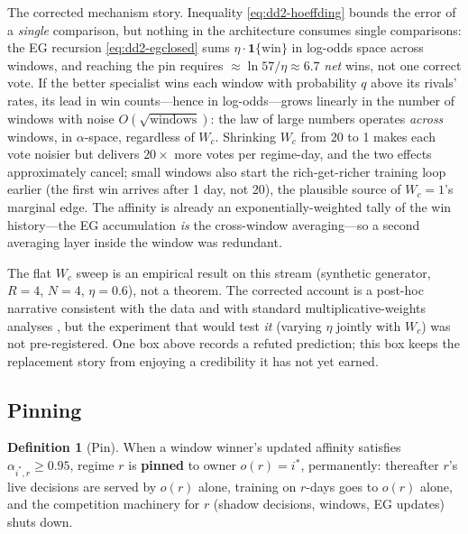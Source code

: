 \documentclass[11pt,a4paper]{article}
\theoremstyle{definition}
\newtheorem{definition}{Definition}[section]
\theoremstyle{plain}
\begin{document}
The corrected mechanism story. Inequality \eqref{eq:dd2-hoeffding} bounds the
error of a \emph{single} comparison, but nothing in the architecture consumes
single comparisons: the EG recursion \eqref{eq:dd2-egclosed} sums
$\eta \cdot \mathbf{1}\{\text{win}\}$ in log-odds space across windows, and
reaching the pin requires $\approx \ln 57 / \eta \approx 6.7$ \emph{net}
wins, not one correct vote. If the better specialist wins each window with
probability $q$ above its rivals' rates, its lead in win counts---hence in
log-odds---grows linearly in the number of windows with noise
$O(\sqrt{\text{windows}})$: the law of large numbers operates \emph{across}
windows, in $\alpha$-space, regardless of $W_c$. Shrinking $W_c$ from 20 to 1
makes each vote noisier but delivers $20\times$ more votes per regime-day,
and the two effects approximately cancel; small windows also start the
rich-get-richer training loop earlier (the first win arrives after 1 day, not
20), the plausible source of $W_c = 1$'s marginal edge. The affinity is
already an exponentially-weighted tally of the win history---the EG
accumulation \emph{is} the cross-window averaging---so a second averaging
layer inside the window was redundant.

\begin{warning}[title={Do not quietly upgrade the corrected story to a prediction}]
The flat $W_c$ sweep is an empirical result on this stream (synthetic
generator, $R = 4$, $N = 4$, $\eta = 0.6$), not a theorem. The corrected
account is a post-hoc narrative consistent with the data and with standard
multiplicative-weights analyses
\citep{freund1997decision, arora2012multiplicative}, but the experiment that
would test \emph{it} (varying $\eta$ jointly with $W_c$) was not
pre-registered. One box above records a refuted prediction; this box keeps
the replacement story from enjoying a credibility it has not yet earned.
\end{warning}

\subsection{Pinning}
\label{sec:dd2-pinning}

\begin{definition}[Pin]
\label{def:dd2-pin}
When a window winner's updated affinity satisfies
$\alpha_{i^{*}, r} \ge 0.95$, regime $r$ is \textbf{pinned} to owner
$o(r) = i^{*}$, permanently: thereafter $r$'s live decisions are served by
$o(r)$ alone, training on $r$-days goes to $o(r)$ alone, and the competition
machinery for $r$ (shadow decisions, windows, EG updates) shuts down.
\end{definition}
\end{document}
